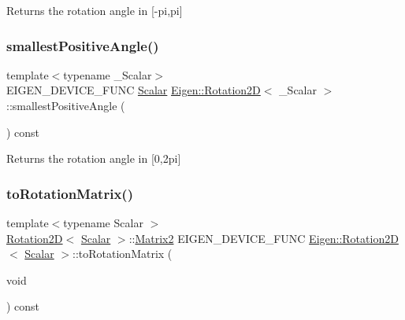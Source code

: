 \begin{DoxyReturn}{Returns}
the rotation angle in \mbox{[}-\/pi,pi\mbox{]} 
\end{DoxyReturn}
\mbox{\label{class_eigen_1_1_rotation2_d_ad3445ec4d8b7931f16096c1894e7986f}} 
\subsubsection{\texorpdfstring{smallestPositiveAngle()}{smallestPositiveAngle()}}
{\footnotesize\ttfamily template$<$typename \+\_\+\+Scalar$>$ \\
E\+I\+G\+E\+N\+\_\+\+D\+E\+V\+I\+C\+E\+\_\+\+F\+U\+NC \mbox{\hyperlink{class_eigen_1_1_rotation2_d_ac20c665ece0f197a712a2a39ae72e4e4}{Scalar}} \mbox{\hyperlink{class_eigen_1_1_rotation2_d}{Eigen\+::\+Rotation2D}}$<$ \+\_\+\+Scalar $>$\+::smallest\+Positive\+Angle (\begin{DoxyParamCaption}{ }\end{DoxyParamCaption}) const\hspace{0.3cm}{\ttfamily [inline]}}

\begin{DoxyReturn}{Returns}
the rotation angle in \mbox{[}0,2pi\mbox{]} 
\end{DoxyReturn}
\mbox{\label{class_eigen_1_1_rotation2_d_a417985ee6adae46447bb1b1d8d17a824}} 
\subsubsection{\texorpdfstring{toRotationMatrix()}{toRotationMatrix()}}
{\footnotesize\ttfamily template$<$typename Scalar $>$ \\
\mbox{\hyperlink{class_eigen_1_1_rotation2_d}{Rotation2D}}$<$ \mbox{\hyperlink{class_eigen_1_1_rotation2_d_ac20c665ece0f197a712a2a39ae72e4e4}{Scalar}} $>$\+::\mbox{\hyperlink{class_eigen_1_1_matrix}{Matrix2}} E\+I\+G\+E\+N\+\_\+\+D\+E\+V\+I\+C\+E\+\_\+\+F\+U\+NC \mbox{\hyperlink{class_eigen_1_1_rotation2_d}{Eigen\+::\+Rotation2D}}$<$ \mbox{\hyperlink{class_eigen_1_1_rotation2_d_ac20c665ece0f197a712a2a39ae72e4e4}{Scalar}} $>$\+::to\+Rotation\+Matrix (\begin{DoxyParamCaption}\item[{void}]{ }\end{DoxyParamCaption}) const}

